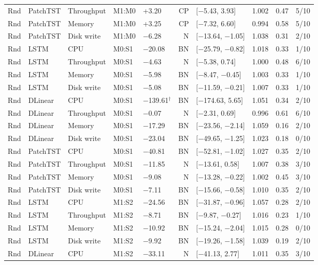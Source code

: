 \documentclass[a4paper,11pt]{article}
\begin{document}
\begin{longtable}{@{}lllllrlrrr@{}}
Rnd & PatchTST & Throughput & M1:M0 & +3.20 & CP & [$-$5.43, 3.93] & 1.002 & 0.47 & 5/10 \\
Rnd & PatchTST & Memory & M1:M0 & +3.25 & CP & [$-$7.32, 6.60] & 0.994 & 0.58 & 5/10 \\
Rnd & PatchTST & Disk write & M1:M0 & $-$6.28 & N & [$-$13.64, $-$1.05] & 1.038 & 0.31 & 2/10 \\
Rnd & LSTM & CPU & M0:S1 & $-$20.08 & BN & [$-$25.79, $-$0.82] & 1.018 & 0.33 & 1/10 \\
Rnd & LSTM & Throughput & M0:S1 & $-$4.63 & N & [$-$5.38, 0.74] & 1.000 & 0.48 & 6/10 \\
Rnd & LSTM & Memory & M0:S1 & $-$5.98 & BN & [$-$8.47, $-$0.45] & 1.003 & 0.33 & 1/10 \\
Rnd & LSTM & Disk write & M0:S1 & $-$5.08 & BN & [$-$11.59, $-$0.21] & 1.007 & 0.33 & 1/10 \\
Rnd & DLinear & CPU & M0:S1 & $-$139.61$^{\dagger}$ & BN & [$-$174.63, 5.65] & 1.051 & 0.34 & 2/10 \\
Rnd & DLinear & Throughput & M0:S1 & $-$0.07 & N & [$-$2.31, 0.69] & 0.996 & 0.61 & 6/10 \\
Rnd & DLinear & Memory & M0:S1 & $-$17.29 & BN & [$-$23.56, $-$2.14] & 1.059 & 0.16 & 2/10 \\
Rnd & DLinear & Disk write & M0:S1 & $-$23.04 & BN & [$-$49.65, $-$1.25] & 1.023 & 0.18 & 0/10 \\
Rnd & PatchTST & CPU & M0:S1 & $-$40.81 & BN & [$-$52.81, $-$1.02] & 1.027 & 0.35 & 2/10 \\
Rnd & PatchTST & Throughput & M0:S1 & $-$11.85 & N & [$-$13.61, 0.58] & 1.007 & 0.38 & 3/10 \\
Rnd & PatchTST & Memory & M0:S1 & $-$9.08 & N & [$-$13.28, $-$0.22] & 1.002 & 0.45 & 3/10 \\
Rnd & PatchTST & Disk write & M0:S1 & $-$7.11 & BN & [$-$15.66, $-$0.58] & 1.010 & 0.35 & 2/10 \\
Rnd & LSTM & CPU & M1:S2 & $-$24.56 & BN & [$-$31.87, $-$0.96] & 1.057 & 0.28 & 2/10 \\
Rnd & LSTM & Throughput & M1:S2 & $-$8.71 & BN & [$-$9.87, $-$0.27] & 1.016 & 0.23 & 1/10 \\
Rnd & LSTM & Memory & M1:S2 & $-$10.92 & BN & [$-$15.24, $-$2.04] & 1.015 & 0.28 & 0/10 \\
Rnd & LSTM & Disk write & M1:S2 & $-$9.92 & BN & [$-$19.26, $-$1.58] & 1.039 & 0.19 & 2/10 \\
Rnd & DLinear & CPU & M1:S2 & $-$33.11 & N & [$-$41.13, 2.77] & 1.011 & 0.35 & 3/10 \\

\end{longtable}
\end{document}
